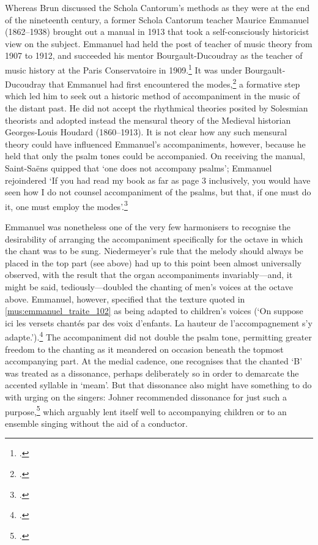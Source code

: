 %
Whereas Brun discussed the Schola Cantorum's methods as they were at the end of the nineteenth century, a former Schola Cantorum teacher Maurice Emmanuel (1862--1938) brought out a manual in 1913 that took a self-consciously historicist view on the subject.
Emmanuel had held the post of teacher of music theory from 1907 to 1912, and succeeded his mentor Bourgault-Ducoudray as the teacher of music history at the Paris Conservatoire in 1909.\footcite[265]{Corbierrelationsmusicalesfrancohelleniques2018}
It was under Bourgault-Ducoudray that Emmanuel had first encountered the modes,\footcite[279]{StewartMauriceEmmanuel18621939} a formative step which led him to seek out a historic method of accompaniment in the music of the distant past.
He did not accept the rhythmical theories posited by Solesmian theorists and adopted instead the mensural theory of the Medieval historian Georges-Louis Houdard (1860--1913).
%
It is not clear how any such mensural theory could have influenced Emmanuel's accompaniments, however, because he held that only the psalm tones could be accompanied.
On receiving the manual, Saint-Saëns quipped that `one does not accompany psalms'; Emmanuel rejoindered `If you had read my book as far as page 3 inclusively, you would have seen how I do not counsel accompaniment of the psalms, but that, if one must do it, one must employ the modes'.\footcite[162]{StevensonMauriceEmmanuelBelated1959}

\label{cc:emmanuel_octave}%
Emmanuel was nonetheless one of the very few harmonisers to recognise the desirability of arranging the accompaniment specifically for the octave in which the chant was to be sung.
Niedermeyer's rule that the melody should always be placed in the top part (see  above) had up to this point been almost universally observed, with the result that the organ accompaniments invariably---and, it might be said, tediously---doubled the chanting of men's voices at the octave above.
Emmanuel, however, specified that the texture quoted in \cref{mus:emmanuel_traite_102} as being adapted to children's voices (`On suppose ici les versets chantés par des voix d'enfants. La hauteur de l'accompagnement s'y adapte.').\footcite[102]{EmmanuelTraiteaccompagnementmodal1913}
The accompaniment did not double the psalm tone, permitting greater freedom to the chanting as it meandered on occasion beneath the topmost accompanying part.
At the medial cadence, one recognises that the chanted `B'\kern 1pt\natural{} was treated as a dissonance, perhaps deliberately so in order to demarcate the accented syllable in `meam'.
But that dissonance also might have something to do with urging on the singers: Johner recommended dissonance for just such a purpose,\footcite[296]{JohnerNewSchoolGregorian1925} which arguably lent itself well to accompanying children or to an ensemble singing without the aid of a conductor.

